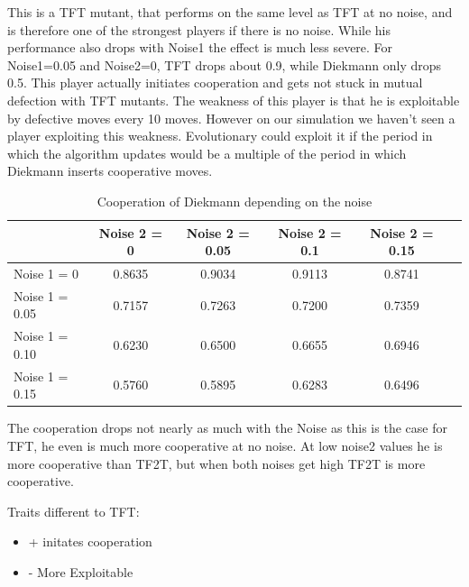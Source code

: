 \documentclass[11pt,twoside]{article}
\begin{document}
This is a TFT mutant, that performs on the same level as TFT at no noise, and is therefore one of the strongest players if there is no noise. While his performance also drops with Noise1 the effect is much less severe. For Noise1=0.05 and Noise2=0, TFT drops about 0.9, while Diekmann only drops 0.5. This player actually initiates cooperation and gets not stuck in mutual defection with TFT mutants. The weakness of this player is that he is exploitable by defective moves every 10 moves. However on our simulation we haven't seen a player exploiting this weakness. Evolutionary could exploit it if the period in which the algorithm updates would be a multiple of the period in which Diekmann inserts cooperative moves.

\begin{table}[h]
 \begin{center}
\caption{Cooperation of Diekmann depending on the noise} \vspace{3mm}
\begin{tabular}{|l|c|c|c|c|c|}
\hline
   	& Noise 2 = 0 & Noise 2 = 0.05& Noise 2 = 0.1& Noise 2 = 0.15 \\
  \hline
  Noise 1 = 0 	&               0.8635 &   0.9034   & 0.9113 &  0.8741 \\
 \hline
  Noise 1 = 0.05	 &            0.7157 &   0.7263  &  0.7200  &  0.7359 \\
 \hline
  Noise 1 = 0.10 	&           0.6230  &  0.6500  &  0.6655 &   0.6946 \\
 \hline
  Noise 1 = 0.15 	&   0.5760 &   0.5895  &  0.6283 &   0.6496 \\
 \hline
\end{tabular}
 \end{center}
\end{table}

The cooperation drops not nearly as much with the Noise as this is the case for TFT, he even is much more cooperative at no noise. At low noise2 values he is more cooperative than TF2T, but when both noises get high TF2T is more cooperative.

Traits different to TFT:

\renewcommand{\labelitemi}{}
\begin{itemize}
	\item + initates cooperation
	\item - More Exploitable
\end{itemize}
\renewcommand{\labelitemi}{$\bullet$}

\newpage
\end{document}
